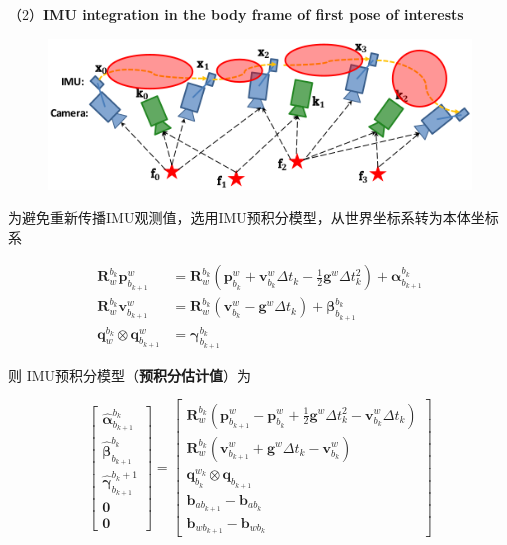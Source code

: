 \documentclass[12pt,a4paper]{article}
\begin{document}
（2）\textbf{IMU integration in the body frame of first pose of interests}

\begin{figure}[htbp]
\centering
\includegraphics[scale=0.6]{images/imu_integration_02.png}
\end{figure}

为避免重新传播IMU观测值，选用IMU预积分模型，从世界坐标系转为本体坐标系

\begin{equation}
\begin{aligned} 
\mathbf{R}_{w}^{b_{k}} \mathbf{p}_{b_{k+1}}^{w} &=
\mathbf{R}_{w}^{b_{k}}\left(\mathbf{p}_{b_{k}}^{w}+\mathbf{v}_{b_{k}}^{w} \Delta t_{k}-\frac{1}{2} \mathbf{g}^{w} \Delta t_{k}^{2}\right)+\boldsymbol{\alpha}_{b_{k+1}}^{b_{k}} \\ 
\mathbf{R}_{w}^{b_{k}} \mathbf{v}_{b_{k+1}}^{w} &=
\mathbf{R}_{w}^{b_{k}}\left(\mathbf{v}_{b_{k}}^{w}-\mathbf{g}^{w} \Delta t_{k}\right)+\boldsymbol{\beta}_{b_{k+1}}^{b_{k}} \\ 
\mathbf{q}_{w}^{b_{k}} \otimes \mathbf{q}_{b_{k+1}}^{w} &=
\boldsymbol{\gamma}_{b_{k+1}}^{b_{k}} 
\end{aligned}
\end{equation}

则 IMU预积分模型（\textbf{预积分估计值}）为

\begin{equation}
\label{equ:preinte_estimate}
\left[\begin{array}{c}
{\hat{\boldsymbol{\alpha}}_{b_{k+1}}^{b_{k}}} \\ 
{\hat{\boldsymbol{\beta}}_{b_{k+1}}^{b_{k}}}  \\ 
{\hat{\boldsymbol{\gamma}}_{b_{k+1}}^{b_{k}+1}} \\ 
{\mathbf{0}} \\ 
{\mathbf{0}}
\end{array}\right]=
\left[\begin{array}{c}
{\mathbf{R}_{w}^{b_{k}}\left(\mathbf{p}_{b_{k+1}}^{w}-\mathbf{p}_{b_{k}}^{w}+\frac{1}{2} \mathbf{g}^{w} \Delta t_{k}^{2}-\mathbf{v}_{b_{k}}^{w} \Delta t_{k}\right)} \\
{\mathbf{R}_{w}^{b_{k}}\left(\mathbf{v}_{b_{k+1}}^{w}+\mathbf{g}^{w} \Delta t_{k}-\mathbf{v}_{b_{k}}^{w}\right)} \\ 
{\mathbf{q}_{b_{k}}^{w_{k}} \otimes \mathbf{q}_{b_{k+1}}} \\ 
{\mathbf{b}_{a b_{k+1}}-\mathbf{b}_{a b_{k}}} \\ 
{\mathbf{b}_{w b_{k+1}}-\mathbf{b}_{w b_{k}}}
\end{array}\right]
\end{equation}
\end{document}
